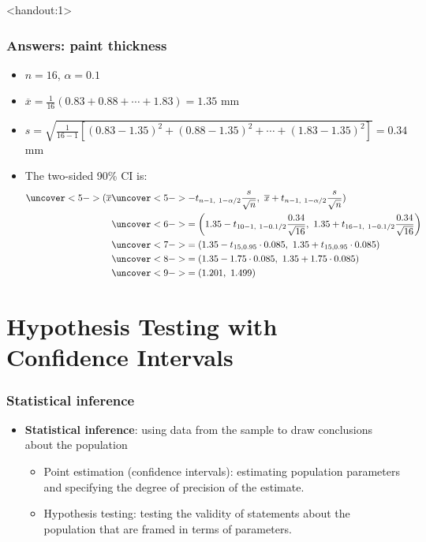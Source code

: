 \documentclass[handout]{beamer}\usepackage[]{graphicx}\usepackage[]{color}
\newcommand{\answers}{1}
\providecommand{\ov}[1]{\overline{#1}}
\numberwithin{equation}{section}
\begin{document}
\begin{frame}<handout:\answers>
\frametitle{Answers: paint thickness} \scriptsize
\begin{itemize}
\item $n = 16$, $\alpha = 0.1$
\pause \item $\ov{x} = \frac{1}{16}(0.83 + 0.88 + \cdots + 1.83) = 1.35$ mm
\pause \item $s = \sqrt{\frac{1}{16-1} [(0.83 - 1.35)^2 + (0.88 - 1.35)^2 + \cdots + (1.83-1.35)^2]} = 0.34$ mm
\pause \item The two-sided 90\% CI is:
\begin{align*}
\uncover<5->{(\ov{x}}&\uncover<5->{ - t_{n - 1, \ 1 - \alpha/2} \frac{s}{\sqrt{n}},\ \ov{x} + t_{n - 1, \ 1- \alpha/2 } \frac{s}{\sqrt{n}})} \\
&\uncover<6->{= \left (1.35 - t_{10 - 1, \ 1 - 0.1/2} \frac{0.34}{\sqrt{16}}, \ 1.35 + t_{16 - 1, \ 1 - 0.1/2} \frac{0.34}{\sqrt{16}} \right )} \\
&\uncover<7->{= (1.35 - t_{15, 0.95} \cdot 0.085, \ 1.35 + t_{15, 0.95} \cdot0.085)} \\
&\uncover<8->{= (1.35 - 1.75 \cdot 0.085, \ 1.35 + 1.75 \cdot 0.085)} \\
&\uncover<9->{= (1.201, \ 1.499)}
\end{align*}
\end{itemize}

\end{frame}




\section{Hypothesis Testing with Confidence Intervals}
\begin{frame}
\frametitle{Statistical inference}
\begin{itemize}
\item {\bf Statistical inference}: using data from the sample to draw conclusions about the population 
\begin{itemize}
\pause \item Point estimation (confidence intervals): estimating population parameters and specifying the degree of precision of the estimate.
\pause \item Hypothesis testing: testing the validity of statements about the population that are framed in terms of parameters. 
\end{itemize}
\end{itemize}
\end{frame}
\end{document}
